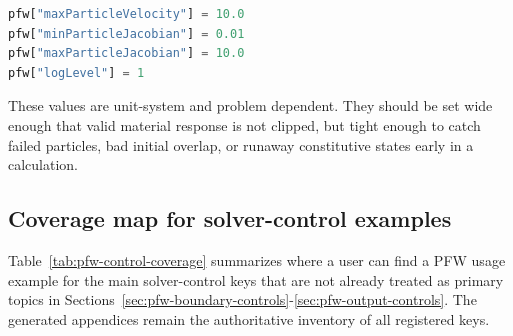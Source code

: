 \begin{lstlisting}[language=Python,caption={Common robustness guard parameters.}]
pfw["maxParticleVelocity"] = 10.0
pfw["minParticleJacobian"] = 0.01
pfw["maxParticleJacobian"] = 10.0
pfw["logLevel"] = 1
\end{lstlisting}

These values are unit-system and problem dependent.  They should be set wide enough that valid material response is not clipped, but tight enough to catch failed particles, bad initial overlap, or runaway constitutive states early in a calculation.

\subsection{Coverage map for solver-control examples}

Table~\ref{tab:pfw-control-coverage} summarizes where a user can find a PFW usage example for the main solver-control keys that are not already treated as primary topics in Sections~\ref{sec:pfw-boundary-controls}-\ref{sec:pfw-output-controls}.  The generated appendices remain the authoritative inventory of all registered keys.

